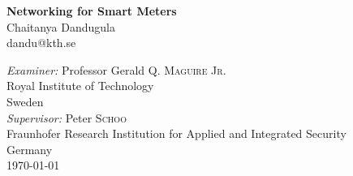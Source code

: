 \documentclass[a4paper,12pt, oneside, openright, draft]{report}
\begin{document}
\begin{titlepage}
\newcommand{\HRule}{\rule{\linewidth}{0.5mm}}
\begin{center}


{ \huge \bfseries Networking for Smart Meters}\\[0.4cm]
{\large Chaitanya Dandugula}\\
{\small dandu@kth.se}

\vfill

\emph{Examiner:} Professor Gerald \textsc{Q. Maguire Jr.}\\
{Royal Institute of Technology}\\
{Sweden}\\[0.8cm]

\emph{Supervisor:} Peter \textsc{Schoo}\\
{Fraunhofer Research Institution for Applied and Integrated Security}\\
{Germany}\\[0.8cm]

{\small \today}

\end{center}

\end{titlepage}

\begin{abstract}

\indent This literature study report is part of the Master's thesis project - ``Networking for Smart Meters''. The report starts by giving a broad overview of the problem that is to be solved and then moves on to different technologies, specifically PLC, 6LoWPAN, and HIP, that can be used to develop the network architecture. Methods for securing the network include the Resurrecting Duckling Policy and the BSI Protection Profile. These methods are discussed before concluding the report with a summary of the previous work done in this field. 

The result of this literature study will be the base for further work and implementation of a proof-of-concept based on the chosen network architecture. 

\end{abstract}

\tableofcontents
\listoffigures
\listoftables
\renewcommand{\nomname}{List of Abbreviations}
\printnomenclature[2.5cm]













\end{document}
